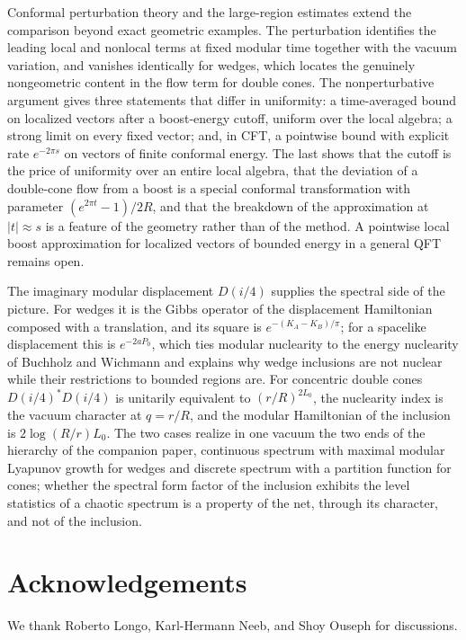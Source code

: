 \documentclass[a4paper,11pt]{article}
\theoremstyle{definition}
\begin{document}
Conformal perturbation theory and the large-region estimates extend the comparison beyond exact geometric examples. The perturbation identifies the leading local and nonlocal terms at fixed modular time together with the vacuum variation, and vanishes identically for wedges, which locates the genuinely nongeometric content in the flow term for double cones. The nonperturbative argument gives three statements that differ in uniformity: a time-averaged bound on localized vectors after a boost-energy cutoff, uniform over the local algebra; a strong limit on every fixed vector; and, in CFT, a pointwise bound with explicit rate $e^{-2\pi s}$ on vectors of finite conformal energy. The last shows that the cutoff is the price of uniformity over an entire local algebra, that the deviation of a double-cone flow from a boost is a special conformal transformation with parameter $(e^{2\pi t}-1)/2R$, and that the breakdown of the approximation at $|t|\approx s$ is a feature of the geometry rather than of the method. A pointwise local boost approximation for localized vectors of bounded energy in a general QFT remains open.

The imaginary modular displacement $D(i/4)$ supplies the spectral side of the picture. For wedges it is the Gibbs operator of the displacement Hamiltonian composed with a translation, and its square is $e^{-(K_A-K_B)/\pi}$; for a spacelike displacement this is $e^{-2aP_0}$, which ties modular nuclearity to the energy nuclearity of Buchholz and Wichmann and explains why wedge inclusions are not nuclear while their restrictions to bounded regions are. For concentric double cones $D(i/4)^*D(i/4)$ is unitarily equivalent to $(r/R)^{2L_0}$, the nuclearity index is the vacuum character at $q=r/R$, and the modular Hamiltonian of the inclusion is $2\log(R/r)L_0$. The two cases realize in one vacuum the two ends of the hierarchy of the companion paper, continuous spectrum with maximal modular Lyapunov growth for wedges and discrete spectrum with a partition function for cones; whether the spectral form factor of the inclusion exhibits the level statistics of a chaotic spectrum is a property of the net, through its character, and not of the inclusion.

\section*{Acknowledgements}
We thank Roberto Longo, Karl-Hermann Neeb, and Shoy Ouseph for discussions.

\appendix
\end{document}
